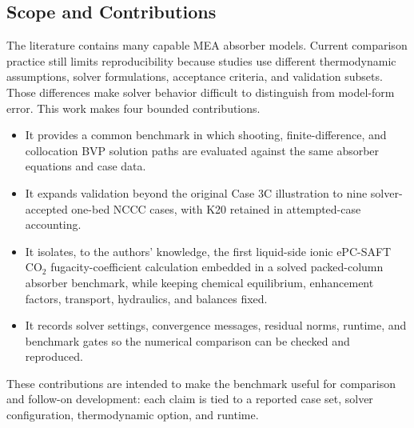     \subsection{Scope and Contributions}
        The literature contains many capable MEA absorber models. Current comparison practice still limits reproducibility because studies use different thermodynamic assumptions, solver formulations, acceptance criteria, and validation subsets. Those differences make solver behavior difficult to distinguish from model-form error. This work makes four bounded contributions.
        \begin{itemize}
            \item It provides a common benchmark in which shooting, finite-difference, and collocation BVP solution paths are evaluated against the same absorber equations and case data.
            \item It expands validation beyond the original Case 3C illustration to nine solver-accepted one-bed NCCC cases, with K20 retained in attempted-case accounting.
            \item It isolates, to the authors' knowledge, the first liquid-side ionic ePC-SAFT CO$_2$ fugacity-coefficient calculation embedded in a solved packed-column absorber benchmark, while keeping chemical equilibrium, enhancement factors, transport, hydraulics, and balances fixed.
            \item It records solver settings, convergence messages, residual norms, runtime, and benchmark gates so the numerical comparison can be checked and reproduced.
        \end{itemize}
        These contributions are intended to make the benchmark useful for comparison and follow-on development: each claim is tied to a reported case set, solver configuration, thermodynamic option, and runtime.
    


